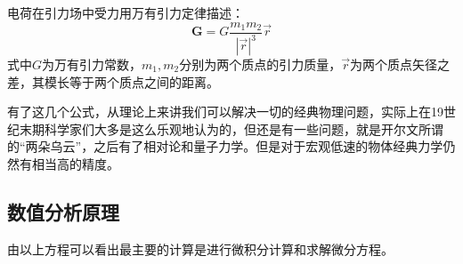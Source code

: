 \documentclass[UTF8,a4paper,10pt]{ctexart}
\begin{document}
\begin{multicols}{2}
        电荷在引力场中受力用万有引力定律描述：
        \begin{equation}
            \bm{G} = G\frac{m_1m_2}{|\vec r|^3}\vec r
        \end{equation}
        式中$G$为万有引力常数，$m_1,m_2$分别为两个质点的引力质量，$\vec r$为两个质点矢径之差，其模长等于两个质点之间的距离。\par
        有了这几个公式，从理论上来讲我们可以解决一切的经典物理问题，实际上在19世纪末期科学家们大多是这么乐观地认为的，但还是有一些问题，就是开尔文所谓的“两朵乌云”，之后有了相对论和量子力学。但是对于宏观低速的物体经典力学仍然有相当高的精度。\par
        \subsection{数值分析原理}
        由以上方程可以看出最主要的计算是进行微积分计算和求解微分方程。

\end{multicols}
\end{document}
